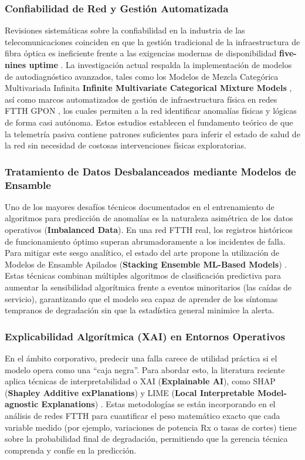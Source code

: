 \documentclass[12pt,a4paper]{article}
\begin{document}
\subsubsection{Confiabilidad de Red y Gestión Automatizada}
Revisiones sistemáticas sobre la confiabilidad en la industria de las telecomunicaciones coinciden en que la gestión tradicional de la infraestructura de fibra óptica es ineficiente frente a las exigencias modernas de disponibilidad 
\textbf{five-nines uptime} \cite{slr_reliability}. La investigación actual respalda la implementación de modelos de autodiagnóstico avanzados, tales como los Modelos de Mezcla Categórica Multivariada Infinita \textbf{Infinite Multivariate Categorical Mixture Models} \cite{infinite_mixture}, así como marcos automatizados de gestión de infraestructura física en redes FTTH GPON \cite{automated_gpon}, los cuales permiten a la red identificar anomalías físicas y lógicas de forma casi autónoma. Estos estudios establecen el fundamento teórico de que la telemetría pasiva contiene patrones suficientes para inferir el estado de salud de la red sin necesidad de costosas intervenciones físicas exploratorias.

\subsubsection{Tratamiento de Datos Desbalanceados mediante Modelos de Ensamble}
Uno de los mayores desafíos técnicos documentados en el entrenamiento de algoritmos para predicción de anomalías es la naturaleza asimétrica de los datos operativos (\textbf{Imbalanced Data}). En una red FTTH real, los registros históricos de funcionamiento óptimo superan abrumadoramente a los incidentes de falla. 
Para mitigar este sesgo analítico, el estado del arte propone la utilización de Modelos de Ensamble Apilados (\textbf{Stacking Ensemble ML-Based Models}) \cite{stacking_ensemble}. Estas técnicas combinan múltiples algoritmos de clasificación predictiva para aumentar la sensibilidad algorítmica frente a eventos minoritarios (las caídas de servicio), garantizando que el modelo sea capaz de aprender de los síntomas tempranos de degradación sin que la estadística general minimice la alerta.

\subsubsection{Explicabilidad Algorítmica (XAI) en Entornos Operativos}
En el ámbito corporativo, predecir una falla carece de utilidad práctica si el modelo opera como una ``caja negra''. Para abordar esto, la literatura reciente aplica técnicas de interpretabilidad o XAI (\textbf{Explainable AI}), como SHAP (\textbf{Shapley Additive exPlanations}) y 
LIME (\textbf{Local Interpretable Model-agnostic Explanations}) \cite{shap_lime}. Estas metodologías se están incorporando en el análisis de redes FTTH para cuantificar el peso matemático exacto que cada variable medido (por ejemplo, variaciones de potencia Rx o tasas de cortes) tiene sobre la probabilidad final de degradación, permitiendo que la gerencia técnica comprenda y confíe en la predicción.
\end{document}
